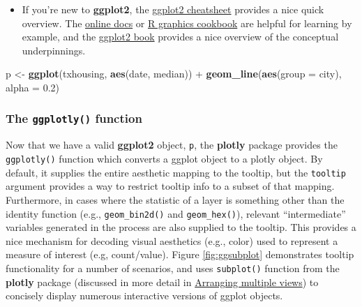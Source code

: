 \documentclass[12pt,]{isuthesis}
\newenvironment{Shaded}{\begin{snugshade}}{\end{snugshade}}
\newcommand{\KeywordTok}[1]{\textcolor[rgb]{0.13,0.29,0.53}{\textbf{{#1}}}}
\newcommand{\DataTypeTok}[1]{\textcolor[rgb]{0.13,0.29,0.53}{{#1}}}
\newcommand{\FloatTok}[1]{\textcolor[rgb]{0.00,0.00,0.81}{{#1}}}
\newcommand{\StringTok}[1]{\textcolor[rgb]{0.31,0.60,0.02}{{#1}}}
\newcommand{\NormalTok}[1]{{#1}}
\newenvironment{rmdblock}[1]
  {\begin{shaded*}
  \begin{itemize}
  \renewcommand{\labelitemi}{
    \raisebox{-.7\height}[0pt][0pt]{
      {\setkeys{Gin}{width=3em,keepaspectratio}\texttt{[image: images/\#1]}}
    }
  }
  \item
  }
  {
  \end{itemize}
  \end{shaded*}
  }
\newenvironment{rmdtip}
  {\begin{rmdblock}{tip}}
  {\end{rmdblock}}
\begin{document}
\begin{rmdtip}
If you're new to \textbf{ggplot2}, the
\href{https://www.rstudio.com/wp-content/uploads/2015/12/ggplot2-cheatsheet-2.0.pdf}{ggplot2
cheatsheet} provides a nice quick overview. The
\href{http://docs.ggplot2.org/current/}{online docs} or
\href{http://www.cookbook-r.com/Graphs/}{R graphics cookbook} are
helpful for learning by example, and the
\href{https://github.com/hadley/ggplot2-book}{ggplot2 book} provides a
nice overview of the conceptual underpinnings.
\end{rmdtip}

\begin{Shaded}
\begin{Highlighting}[]
\NormalTok{p <-}\StringTok{ }\KeywordTok{ggplot}\NormalTok{(txhousing, }\KeywordTok{aes}\NormalTok{(date, median)) +}
\StringTok{  }\KeywordTok{geom_line}\NormalTok{(}\KeywordTok{aes}\NormalTok{(}\DataTypeTok{group =} \NormalTok{city), }\DataTypeTok{alpha =} \FloatTok{0.2}\NormalTok{)}
\end{Highlighting}
\end{Shaded}

\subsubsection{\texorpdfstring{The \texttt{ggplotly()}
function}{The ggplotly() function}}\label{ggplotly}

Now that we have a valid \textbf{ggplot2} object, \texttt{p}, the
\textbf{plotly} package provides the \texttt{ggplotly()} function which
converts a ggplot object to a plotly object. By default, it supplies the
entire aesthetic mapping to the tooltip, but the \texttt{tooltip}
argument provides a way to restrict tooltip info to a subset of that
mapping. Furthermore, in cases where the statistic of a layer is
something other than the identity function (e.g., \texttt{geom\_bin2d()}
and \texttt{geom\_hex()}), relevant ``intermediate'' variables generated
in the process are also supplied to the tooltip. This provides a nice
mechanism for decoding visual aesthetics (e.g., color) used to represent
a measure of interest (e.g, count/value). Figure \ref{fig:ggsubplot}
demonstrates tooltip functionality for a number of scenarios, and uses
\texttt{subplot()} function from the \textbf{plotly} package (discussed
in more detail in \protect\hyperlink{arranging-multiple-views}{Arranging
multiple views}) to concisely display numerous interactive versions of
ggplot objects.
\end{document}
